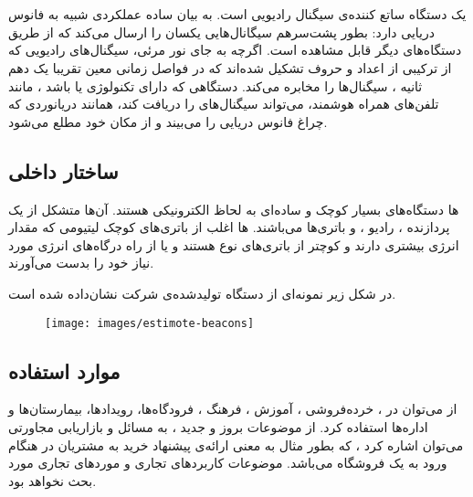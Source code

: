 \documentclass[oneside]{report}
\begin{document}
\section{{\normalsize {}}}
         {\normalsize {}} 
یک دستگاه ساتع کننده‌ی سیگنال رادیویی 
         {\normalsize {}} 
         است.
به بیان ساده 
         {\normalsize {}} 
         عملکردی شبیه به فانوس دریایی دارد: 
        بطور پشت‌سرهم سیگانال‌هایی یکسان را ارسال می‌کند که از طریق دستگاه‌های دیگر قابل مشاهده است. 
       اگرچه به جای نور مرئی، سیگنال‌های رادیویی که از ترکیبی از اعداد و حروف تشکیل شده‌اند که در فواصل زمانی معین تقریبا یک دهم ثانیه ، سیگنال‌ها را مخابره می‌کند. دستگاهی که دارای تکنولوژی 
                {\normalsize {}} 
    یا 
                        {\normalsize {}} 
      باشد ، مانند تلفن‌های همراه هوشمند، می‌تواند سیگنال‌های 
               {\normalsize {}} 
   را دریافت کند، همانند دریانوردی که چراغ فانوس دریایی را می‌بیند و از مکان خود مطلع می‌شود. 
   
 \subsection{ساختار داخلی {\small {}}}
		{\normalsize {}}ها 
		دستگاه‌های بسیار کوچک و ساده‌ای به لحاظ الکترونیکی هستند. آن‌ها متشکل از یک پردازنده ، رادیو ، و باتری‌ها می‌باشند.  
		{\normalsize {}}ها 
		اغلب از باتری‌های کوچک لیتیومی 
 که مقدار انرژی بیشتری دارند و کوچتر از باتری‌های نوع 
                {\normalsize {}} 
 هستند و یا از راه درگاه‌های 
                {\normalsize {}} 
 انرژی مورد نیاز خود را بدست می‌آورند. 

در شکل زیر
نمونه‌ای از دستگاه
{\normalsize {}} 
تولید‌شده‌ی شرکت
{\normalsize {}} 
نشان‌داده شده است.

\begin{figure}[h]
	\label{beacon}
	\centering
	\texttt{[image: images/estimote-beacons]}
	\caption{{\footnotesize {}} }
	\label{fig:estimote-beacons}
\end{figure}


 
 \subsection{موارد استفاده}
 
 از 
                {\normalsize {}} 
                می‌توان  در  ، خرده‌فروشی ، آموزش ، فرهنگ ، فرودگاه‌ها، رویدادها، بیمارستان‌ها و اداره‌ها  استفاده کرد. از موضوعات بروز و جدید ، به مسائل  
                               {\normalsize {}} 
            و    بازاریابی مجاورتی
                می‌توان اشاره کرد‌ ، که بطور مثال به معنی ارائه‌ی  پیشنهاد خرید به مشتریان در هنگام ورود به یک فروشگاه می‌باشد. 
                موضوعات کاربردهای تجاری و  مورد‌های تجاری 
                {\normalsize {}} 
                مورد بحث نخواهد بود.
                
\end{document}
